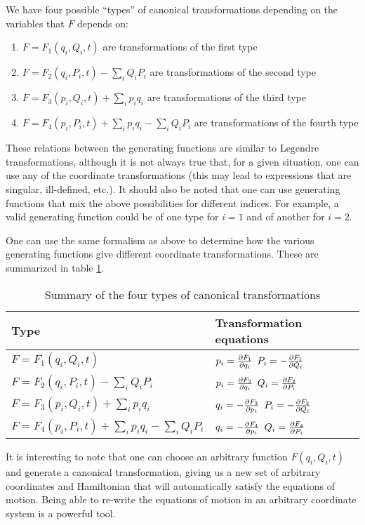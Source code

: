 We have four possible ``types'' of canonical transformations depending on the variables that $F$ depends on:
\begin{enumerate}
\item $F=F_1(q_i,Q_i,t)$ are transformations of the first type
\item $F=F_2(q_i,P_i,t)-\sum_iQ_iP_i$ are transformations of the second type
\item $F=F_3(p_i,Q_i,t)+\sum_ip_iq_i$ are transformations of the third type
\item $F=F_4(p_i,P_i,t)+\sum_ip_iq_i-\sum_iQ_iP_i$ are transformations of the fourth type
\end{enumerate}
These relations between the generating functions are similar to Legendre transformations, although it is not always true that, for a given situation, one can use any of the coordinate transformations (this may lead to expressions that are singular, ill-defined, etc.). It should also be noted that one can use generating functions that mix the above possibilities for different indices. For example, a valid generating function could be of one type for $i=1$ and of another for $i=2$.

One can use the same formalism as above to determine how the various generating functions give different coordinate transformations. These are summarized in table \ref{tab:CanTrans}.
\begin{table}[!h]
\center
\renewcommand{\arraystretch}{1.5}
\begin{tabular}{|l|l|}
\hline
\textbf{Type}&\textbf{Transformation equations}\\
\hline
$F=F_1(q_i,Q_i,t)$ & $p_i=\frac{\partial F_1}{\partial q_i}$ $P_i=-\frac{\partial F_1}{\partial Q_i}$\\
\hline
$F=F_2(q_i,P_i,t)-\sum_iQ_iP_i$ & $p_i=\frac{\partial F_2}{\partial q_i}$ $Q_i=\frac{\partial F_2}{\partial P_i}$\\
\hline
$F=F_3(p_i,Q_i,t)+\sum_ip_iq_i$ & $q_i=-\frac{\partial F_3}{\partial p_i}$ $P_i=-\frac{\partial F_3}{\partial Q_i}$\\
\hline
$F=F_4(p_i,P_i,t)+\sum_ip_iq_i-\sum_iQ_iP_i$ & $q_i=-\frac{\partial F_4}{\partial p_i}$ $Q_i=\frac{\partial F_4}{\partial P_i}$\\
\hline
\end{tabular}
\caption{\label{tab:CanTrans}Summary of the four types of canonical transformations}
\end{table}

It is interesting to note that one can choose an arbitrary function $F(q_i, Q_i,t)$ and generate a canonical transformation, giving us a new set of arbitrary coordinates and Hamiltonian that will automatically satisfy the equations of motion. Being able to re-write the equations of motion in an arbitrary coordinate system is a powerful tool.

